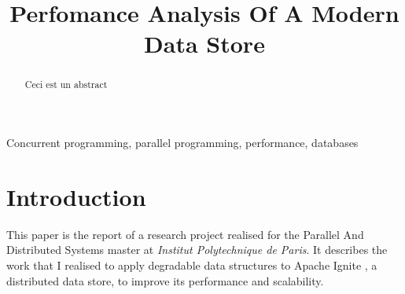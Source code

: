 \documentclass[conference]{IEEEtran}
\begin{document}
\title{Perfomance Analysis Of A Modern Data Store}

\author{
}

\maketitle
\thispagestyle{plain}
\pagestyle{plain}

\begin{abstract}
Ceci est un abstract
\end{abstract}

\begin{IEEEkeywords}
Concurrent programming, parallel programming, performance, databases
\end{IEEEkeywords}

\bigbreak 

\section{Introduction}
This paper is the report of a research project realised for the Parallel And Distributed Systems master at \textit{Institut Polytechnique de Paris}. It describes the work that I realised to apply degradable data structures to Apache Ignite \cite{ignite}, a distributed data store, to improve its performance and scalability.
\end{document}
